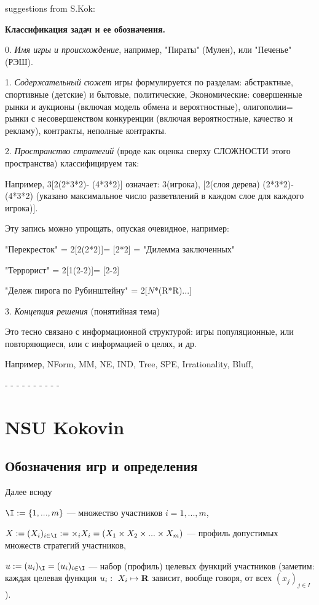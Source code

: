 \documentclass[a4paper,12pt]{article}
\def\R{{\bf R}}
\begin{document}
{\small suggestions from S.Kok:

{\bf Классификация задач и ее обозначения.}

0. {\em Имя игры и происхождение}, например, "Пираты"
(Мулен), или "Печенье" (РЭШ).

1. {\em Содержательный сюжет} игры формулируется по
разделам: абстрактные, спортивные (детские) и бытовые,
политические, Экономические: совершенные рынки и аукционы
(включая модель обмена и вероятностные), олигополии= рынки
с несовершенством конкуренции (включая вероятностные,
качество и рекламу), контракты, неполные контракты.

2. {\em Пространство стратегий} (вроде как оценка сверху
СЛОЖНОСТИ этого пространства) классифицируем так:

Например, 3[2(2*3*2)- (4*3*2)] означает: 3(игрока), [2(слоя
дерева) (2*3*2)- (4*3*2) (указано максимальное число
разветвлений в каждом слое для каждого игрока)].

Эту запись можно упрощать, опуская очевидное, например:

"Перекресток" = 2[2(2*2)]= [2*2] = "Дилемма заключенных"

"Террорист" = 2[1(2-2)]= [2-2]

"Дележ пирога по Рубинштейну" = 2[$N$*(R*R)...]

3. {\em Концепция решения} (понятийная тема)

Это тесно связано с информационной структурой: игры
популяционные, или повторяющиеся, или с информацией о
целях, и др.

Например, NForm, MM, NE, IND, Tree, SPE,
Irrationality, Bluff, }

\vspace{2mm}

- - - - - - - - - -
\newpage
\tableofcontents

\newpage

\section{NSU Kokovin}

\subsection{Обозначения игр и определения}

Далее всюду  \bedscr\item  $ \I := \{1,...,m \}$
---  множество участников $i=1,...,m$, \item  $X:=
(X_i)_{i\in \I}  := \times_{i} X_i = (X_1\times
X_2\times ...  \times  X_m)$ — профиль допустимых
множеств стратегий участников,
 \item $u:= (u_i)_\I = (u_i)_{i\in \I }$ — набор (профиль)
целевых функций участников (заметим: каждая целевая функция
$u_i:~X_i\mapsto \R$ зависит, вообще говоря, от всех
$(x_j)_{j\in I}$). \edscr
\end{document}
